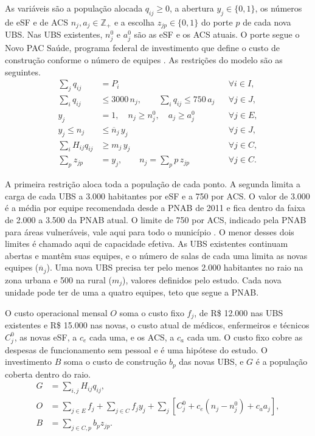 \documentclass[12pt,a4paper,oneside]{report}
\begin{document}
As variáveis são a população alocada $q_{ij}\geq0$, a abertura $y_j\in\{0,1\}$, os números de eSF e de
ACS $n_j,a_j\in\mathbb{Z}_+$ e a escolha $z_{jp}\in\{0,1\}$ do porte $p$ de cada nova UBS. Nas UBS
existentes, $n_j^0$ e $a_j^0$ são as eSF e os ACS atuais. O porte segue
o Novo PAC Saúde, programa federal de investimento que define o custo de construção conforme o número
de equipes \citep{novopac2025}. As restrições do modelo são as seguintes.
\begin{align}
\sum_j q_{ij}&=P_i &&\forall i\in I,\\
\sum_i q_{ij}&\leq3000\,n_j,\qquad \sum_i q_{ij}\leq750\,a_j &&\forall j\in J,\\
y_j&=1,\quad n_j\geq n_j^0,\quad a_j\geq a_j^0 &&\forall j\in E,\\
y_j\leq n_j&\leq\overline n_j\, y_j &&\forall j\in J,\\
\sum_i H_{ij}q_{ij}&\geq m_j\,y_j &&\forall j\in C,\\
\sum_p z_{jp}&=y_j,\qquad n_j=\sum_p p\,z_{jp} &&\forall j\in C.
\end{align}

A primeira restrição aloca toda a população de cada ponto. A segunda limita a carga de cada UBS a 3.000
habitantes por eSF e a 750 por ACS. O valor de 3.000 é a média por equipe recomendada desde a
PNAB de 2011 \citep{brasil2013teto} e fica dentro da faixa de 2.000 a 3.500 da PNAB atual. O limite de 750 por ACS, indicado pela PNAB para áreas vulneráveis, vale aqui para
todo o município \citep{pnab2017}. O menor desses dois limites é chamado aqui de capacidade efetiva. As UBS existentes continuam abertas e mantêm suas equipes, e o
número de salas de cada uma limita as novas equipes ($\overline n_j$). Uma nova UBS precisa ter pelo menos
2.000 habitantes no raio na zona urbana e 500 na rural ($m_j$), valores definidos pelo estudo. Cada nova
unidade pode ter de uma a quatro equipes, teto que segue a PNAB.

O custo operacional mensal $O$ soma o custo fixo $f_j$, de R\$ 12.000 nas UBS existentes e R\$ 15.000
nas novas, o custo atual de médicos, enfermeiros e técnicos $C_j^0$, as novas eSF, a $c_e$ cada uma, e os ACS, a $c_a$ cada um. O custo fixo
cobre as despesas de funcionamento sem pessoal e é uma hipótese do estudo. O
investimento $B$ soma o custo de construção $b_p$ das novas UBS, e $G$ é a população coberta dentro do
raio.
\begin{align}
G&=\sum_{i,j}H_{ij}q_{ij},\\
O&=\sum_{j\in E}f_j+\sum_{j\in C}f_jy_j+
\sum_j\left[C_j^0+c_e(n_j-n_j^0)+c_aa_j\right],\\
B&=\sum_{j\in C,p}b_pz_{jp}.
\end{align}
\end{document}
